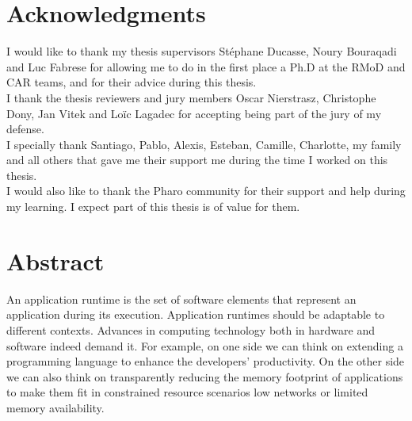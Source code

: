 \documentclass[a4paper,11pt,twoside]{include/ThesisStyle}
\begin{document}


\dominitoc

\cleardoublepage
\chapter*{Acknowledgments}

I would like to thank my thesis supervisors Stéphane Ducasse, Noury Bouraqadi and Luc Fabrese for allowing me to do in the first place a Ph.D at the RMoD and CAR teams, and for their advice during this thesis.\\

\noindent I thank the thesis reviewers and jury members Oscar Nierstrasz, Christophe Dony, Jan Vitek and Loïc Lagadec for accepting being part of the jury of my defense.\\%


\noindent I specially thank Santiago, Pablo, Alexis, Esteban, Camille, Charlotte, my family and all others that gave me their support me during the time I worked on this thesis.\\

\noindent I would also like to thank the Pharo community for their support and help during my learning. I expect part of this thesis is of value for them.\\



\chapter*{Abstract}

An application runtime is the set of software elements that represent an application during its execution. Application runtimes should be adaptable to different contexts. Advances in computing technology both in hardware and software indeed demand it. For example, on one side we can think on extending a programming language to enhance the developers' productivity. On the other side we can also think on transparently reducing the memory footprint of applications to make them fit in constrained resource scenarios \eg low networks or limited memory availability.
\end{document}
